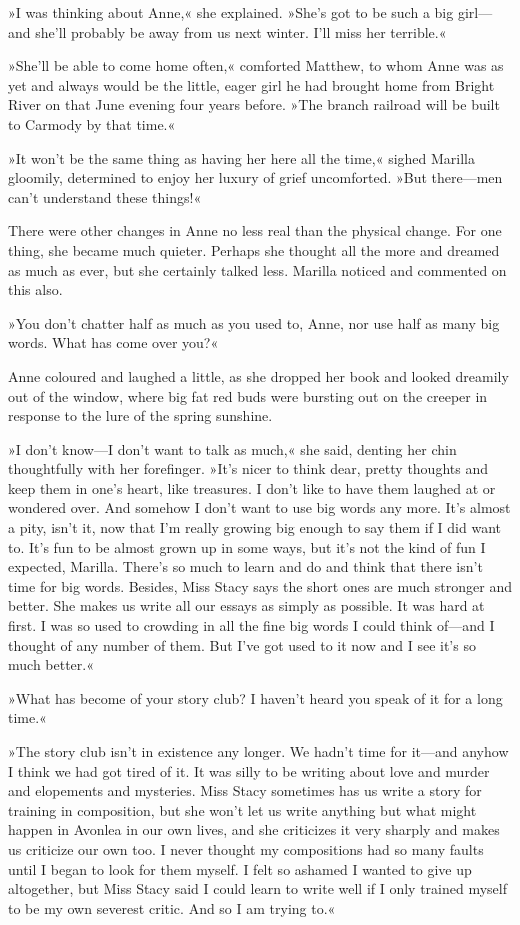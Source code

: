 »I was thinking about Anne,« she explained. »She's got to be such a big girl—and she'll probably be away from us next winter. I'll miss her terrible.«

»She'll be able to come home often,« comforted Matthew, to whom Anne was as yet and always would be the little, eager girl he had brought home from Bright River on that June evening four years before. »The branch railroad will be built to Carmody by that time.«

»It won't be the same thing as having her here all the time,« sighed Marilla gloomily, determined to enjoy her luxury of grief uncomforted. »But there—men can't understand these things!«

There were other changes in Anne no less real than the physical change. For one thing, she became much quieter. Perhaps she thought all the more and dreamed as much as ever, but she certainly talked less. Marilla noticed and commented on this also.

»You don't chatter half as much as you used to, Anne, nor use half as many big words. What has come over you?«

Anne coloured and laughed a little, as she dropped her book and looked dreamily out of the window, where big fat red buds were bursting out on the creeper in response to the lure of the spring sunshine.

»I don't know—I don't want to talk as much,« she said, denting her chin thoughtfully with her forefinger. »It's nicer to think dear, pretty thoughts and keep them in one's heart, like treasures. I don't like to have them laughed at or wondered over. And somehow I don't want to use big words any more. It's almost a pity, isn't it, now that I'm really growing big enough to say them if I did want to. It's fun to be almost grown up in some ways, but it's not the kind of fun I expected, Marilla. There's so much to learn and do and think that there isn't time for big words. Besides, Miss Stacy says the short ones are much stronger and better. She makes us write all our essays as simply as possible. It was hard at first. I was so used to crowding in all the fine big words I could think of—and I thought of any number of them. But I've got used to it now and I see it's so much better.«

»What has become of your story club? I haven't heard you speak of it for a long time.«

»The story club isn't in existence any longer. We hadn't time for it—and anyhow I think we had got tired of it. It was silly to be writing about love and murder and elopements and mysteries. Miss Stacy sometimes has us write a story for training in composition, but she won't let us write anything but what might happen in Avonlea in our own lives, and she criticizes it very sharply and makes us criticize our own too. I never thought my compositions had so many faults until I began to look for them myself. I felt so ashamed I wanted to give up altogether, but Miss Stacy said I could learn to write well if I only trained myself to be my own severest critic. And so I am trying to.«

